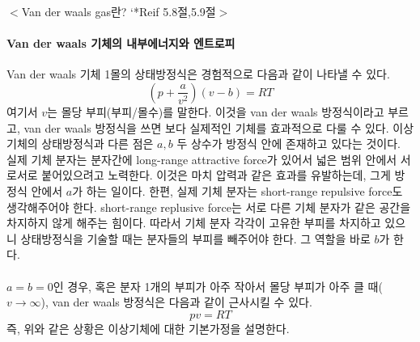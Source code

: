 \documentclass[a4paper,12pt]{article}
\begin{document}
	\begin{flushleft}
		$<$Van der waals gas란? `*Reif 5.8절,5.9절$>$ 
	\end{flushleft}
\paragraph{Van der waals 기체의 내부에너지와 엔트로피}
Van der waals 기체 1몰의 상태방정식은 경험적으로 다음과 같이 나타낼 수 있다.
$$\left(p+\frac{a}{v^2} \right)(v-b)=RT  $$
여기서 $v$는 몰당 부피(부피/몰수)를 말한다. 이것을 van der waals 방정식이라고 부르고, van der waals 방정식을 쓰면 보다 실제적인 기체를 효과적으로 다룰 수 있다. 이상기체의 상태방정식과 다른 점은 $a,b$ 두 상수가 방정식 안에 존재하고 있다는 것이다. 실제 기체 분자는 분자간에 long-range attractive force가 있어서 넓은 범위 안에서 서로서로 붙어있으려고 노력한다. 이것은 마치 압력과 같은 효과를 유발하는데, 그게 방정식 안에서 $a$가 하는 일이다. 한편, 실제 기체 분자는 short-range repulsive force도 생각해주어야 한다. short-range replusive force는 서로 다른 기체 분자가 같은 공간을 차지하지 않게 해주는 힘이다. 따라서 기체 분자 각각이 고유한 부피를 차지하고 있으니 상태방정식을 기술할 때는 분자들의 부피를 빼주어야 한다. 그 역할을 바로 $b$가 한다.
\paragraph{}
$a=b=0$인 경우, 혹은 분자 1개의 부피가 아주 작아서 몰당 부피가 아주 클 때($v\rightarrow\infty$), van der waals 방정식은 다음과 같이 근사시킬 수 있다.
$$pv=RT$$ 
즉, 위와 같은 상황은 이상기체에 대한 기본가정을 설명한다.
\end{document}
